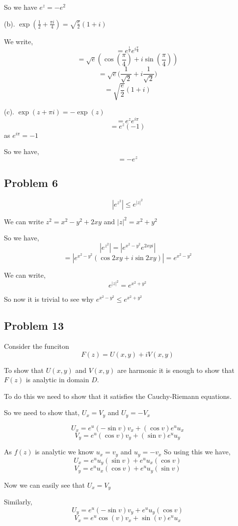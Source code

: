 \documentclass[a4paper]{report}
\begin{document}
So we have  $e^z = -e^2$

(b). $\exp(\frac{1}{2} + \frac{\pi i}{4}) = \sqrt{\frac{e}{2}} (1 + i)$ 

We write, $$ = e^{\frac{1}{2}} e^{i\frac{\pi}{4}} $$ 
$$ = \sqrt{e} (\cos(\frac{\pi}{4}) + i \sin(\frac{\pi}{4})) $$ 
$$ = \sqrt{e}\bigg (\frac{1}{\sqrt{2}} + i \frac{1}{\sqrt{2}}\bigg ) $$ 
$$  = \sqrt{\frac{e}{2}}(1 + i) $$ 


(c). $\exp(z + \pi i) = -\exp (z)$
$$  = e^z e^{i\pi}$$
$$ = e^z (-1) $$  as $e^{i\pi} = -1$

So we have, $$ = -e^z$$

\subsection*{Problem 6}

$$|e^{z^2}| \le e^{|z|^2}$$

We can write $z^2 = x^2 - y^2 + 2xy$ and $|z|^2 = x^2 + y^2$ 

So we have, $$ |e^{z^2}| = |e^{x^2 - y^2} e^{2xyi}| $$ 
$$ = |e^{x^2 - y^2} (\cos 2xy + i \sin 2xy)|  = e^{x^2 - y^2}$$ 

We can write, $$ e^{|z|^2} = e^{x^2 + y^2} $$ 

So now it is trivial to see why $e^{x^2 - y^2} \leq e^{x^2 + y^2}$

\subsection*{Problem 13}
 Consider the funciton $$ F(z) = U(x,y) + i V(x,y)$$ 

 To show that $U(x,y)$ and  $V(x,y)$ are harmonic it is enough to show that  $F(z)$ is analytic in domain $D$.

 To do this we need to show that it satisfies the Cauchy-Riemann equations. 

 So we need to show that, $U_x = V_y$ and  $U_y = -V_x$ 

 $$ U_x = e^u (-\sin v) v_x + (\cos v) e^u u_x $$ 
 $$ V_y = e^u (\cos v) v_y + (\sin v) e^u u_y $$ 

 As $f(z)$ is analytic we know $u_x = v_y$ and  $u_y = -v_x$
So using this we have, $$ U_x = e^u u_y (\sin v) + e^u u_x (\cos v) $$ 
$$ V_y = e^u u_x (\cos v) + e^u u_y (\sin v)$$

Now we can easily see that $U_x = V_y$

Similarly,  $$ U_y = e^u (-\sin v) v_y + e^u u_y (\cos v) $$ 
$$ V_x = e^u \cos(v) v_x + \sin(v) e^u u_x $$ 
\end{document}
